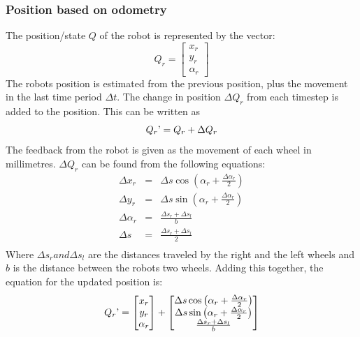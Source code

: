 \subsubsection{Position based on odometry}
The position/state $Q$ of the robot is represented by the vector: 
\begin{equation}
  Q_r = 
  \begin{bmatrix}
    x_r \\
    y_r \\
    \alpha_r
  \end{bmatrix}
\end{equation}
The robots position is estimated from the previous position, plus the movement in the last time period $\Delta t$.
The change in position $\Delta Q_r$ from each timestep is added to the position.
This can be written as 
\begin{equation}
  Q_r\textrm' = Q_r + \Delta Q_r
\end{equation}
The feedback from the robot is given as the movement of each wheel in millimetres.
$\Delta Q_r$ can be found from the following equations: 
\begin{eqnarray}
	\Delta x_r &=& \Delta s \cos \left(\alpha_r + \frac{\Delta \alpha_r}{2}\right) \\
	\Delta y_r &=& \Delta s \sin \left(\alpha_r + \frac{\Delta \alpha_r}{2}\right) \\
	\Delta \alpha_r &=& \frac{\Delta s_r + \Delta s_l}{b} \\
	\Delta s &=& \frac{\Delta s_r + \Delta s_l}{2} \\
\end{eqnarray}
Where $\Delta s_r and \Delta s_l$ are the distances traveled by the right and the left wheels
and $b$ is the distance between the robots two wheels. Adding this together, the equation for the updated position is: 
\begin{equation}
  Q_r\textrm' = 
  \begin{bmatrix}
    x_r \\
    y_r \\
    \alpha_r
  \end{bmatrix}
  +
  \begin{bmatrix}
    \Delta s \cos \left(\alpha_r + \frac{\Delta \alpha_r}{2}\right) \\
    \Delta s \sin \left(\alpha_r + \frac{\Delta \alpha_r}{2}\right) \\
    \frac{\Delta s_r + \Delta s_l}{b}
  \end{bmatrix}
\end{equation}

